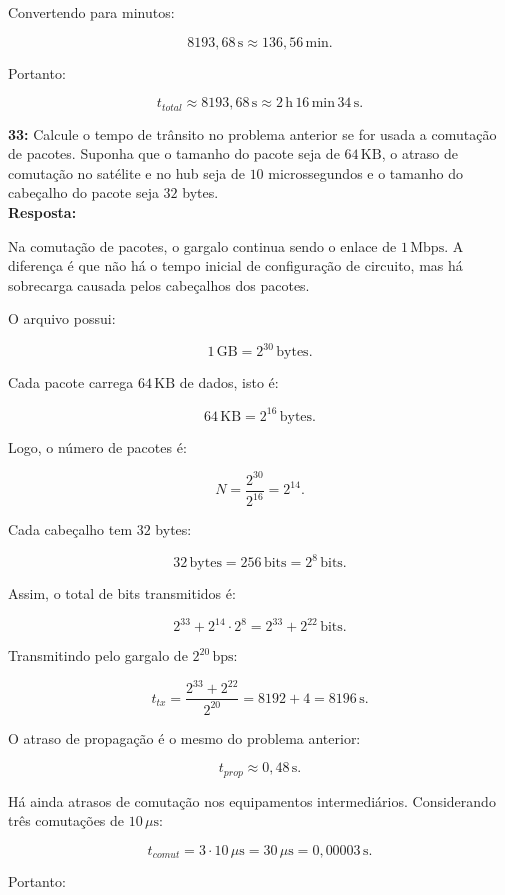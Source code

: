 \documentclass[12pt,a4paper]{report}
\begin{document}
Convertendo para minutos:

\[
8193{,}68\,\text{s} \approx 136{,}56\,\text{min}.
\]

Portanto:

\[
\boxed{t_{total} \approx 8193{,}68\,\text{s} \approx 2\,\text{h}\,16\,\text{min}\,34\,\text{s}}.
\]


\vspace{0.6cm}

\noindent \textbf{33:} Calcule o tempo de trânsito no problema anterior se for usada a comutação de pacotes. Suponha que o tamanho do pacote seja de $64\,\text{KB}$, o atraso de comutação no satélite e no hub seja de $10$ microssegundos e o tamanho do cabeçalho do pacote seja $32$ bytes.\\
\textbf{Resposta:}

Na comutação de pacotes, o gargalo continua sendo o enlace de $1\,\text{Mbps}$. A diferença é que não há o tempo inicial de configuração de circuito, mas há sobrecarga causada pelos cabeçalhos dos pacotes.

O arquivo possui:

\[
1\,\text{GB} = 2^{30}\,\text{bytes}.
\]

Cada pacote carrega $64\,\text{KB}$ de dados, isto é:

\[
64\,\text{KB} = 2^{16}\,\text{bytes}.
\]

Logo, o número de pacotes é:

\[
N = \frac{2^{30}}{2^{16}} = 2^{14}.
\]

Cada cabeçalho tem $32$ bytes:

\[
32\,\text{bytes} = 256\,\text{bits} = 2^8\,\text{bits}.
\]

Assim, o total de bits transmitidos é:

\[
2^{33} + 2^{14}\cdot 2^8 = 2^{33} + 2^{22}\,\text{bits}.
\]

Transmitindo pelo gargalo de $2^{20}\,\text{bps}$:

\[
t_{tx} = \frac{2^{33} + 2^{22}}{2^{20}} = 8192 + 4 = 8196\,\text{s}.
\]

O atraso de propagação é o mesmo do problema anterior:

\[
t_{prop} \approx 0{,}48\,\text{s}.
\]

Há ainda atrasos de comutação nos equipamentos intermediários. Considerando três comutações de $10\,\mu\text{s}$:

\[
t_{comut} = 3 \cdot 10\,\mu\text{s} = 30\,\mu\text{s} = 0{,}00003\,\text{s}.
\]

Portanto:
\end{document}
